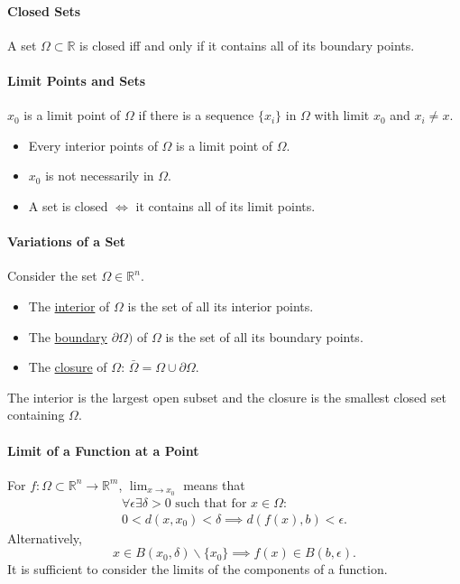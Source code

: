 \paragraph{Closed Sets}
A set \(\Omega \subset \mathbb{R}\) is closed iff and only if it contains all of its boundary points.

\paragraph{Limit Points and Sets}
\(x_0\) is a limit point of \(\Omega\) if there is a sequence \(\{x_i\}\) 
in \(\Omega\) with limit \(x_0\) and \(x_i \neq x\).

\begin{itemize}
    \item Every interior points of \(\Omega\) is a limit point of \(\Omega\).
    \item \(x_0\) is not necessarily in \(\Omega\).
    \item A set is closed \(\Leftrightarrow\) it contains all of its limit points.
\end{itemize}

\paragraph{Variations of a Set}
Consider the set \(\Omega \in \mathbb{R}^n\).
\begin{itemize}
    \item The \underline{interior} of \(\Omega\) is the set of all its interior points.
    \item The \underline{boundary} \(\partial \Omega)\) of \(\Omega\) is the set of all its boundary points.
    \item The \underline{closure} of \(\Omega\): \(\bar{\Omega} = \Omega \cup \partial \Omega\).
\end{itemize}
The interior is the largest open subset and the closure is the smallest closed set containing \(\Omega\).

\paragraph{Limit of a Function at a Point}
For \(f: \Omega \subset \mathbb{R}^n \to \mathbb{R}^m\), 
\(\lim_{x\to x_0}\) means that 
\begin{align*}
    \forall \epsilon \exists \delta > 0\text{ such that for } x\in\Omega: \\
    0 < d(x, x_0) < \delta \implies d(f(x), b) < \epsilon.
\end{align*}
Alternatively,
\[
    x\in B(x_0, \delta) \backslash \{x_0\}
    \implies f(x)\in B(b, \epsilon).
\]
It is sufficient to consider the limits of the components of a function.

